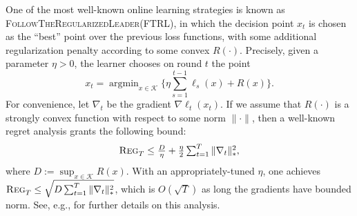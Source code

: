 \documentclass[pmlr]{jmlr} %
\def\K{\mathcal{K}}
\def\argmin{\mathop{\arg\min}}
\def\FTRL{\textsc{FollowTheRegularizedLeader}\xspace}
\newcommand{\uregret}[1]{\textsc{Reg}^{#1}_T}
\begin{document}
One of the most well-known online learning strategies is known as \FTRL (FTRL), in which the decision point $x_{t}$ is chosen as the ``best'' point over the previous loss functions, with some additional regularization penalty according to some convex $R(\cdot)$. Precisely, given a parameter $\eta > 0$, the learner chooses on round $t$ the point
\begin{equation}\label{eq:FTRL}
\textstyle    x_{t} = \argmin_{x \in \K} \{ \eta \textstyle \sum_{s=1}^{t-1} \ell_{s}(x) + R(x) \}.
\end{equation}
For convenience, let $\nabla_{t}$ be the gradient $\nabla \ell_{t}(x_{t})$. If we assume that $R(\cdot)$ is a strongly convex function with respect to some norm $\| \cdot \|$, then a well-known 
regret analysis grants the following bound:
\begin{equation}\label{eq:FTRLbound}
  \textstyle \uregret{} \leq \frac D \eta +  \frac \eta 2 \sum_{t=1}^{T} \| \nabla_{t} \|_{*}^{2},
\end{equation}
where $D := \sup_{x \in \K} R(x)$. With an appropriately-tuned $\eta$, one achieves $\uregret{} \leq \sqrt{D\sum_{t=1}^{T} \| \nabla_{t}\|_{*}^{2}}$, which is $O(\sqrt{T})$ as long the gradients have bounded norm. See, e.g., \cite{shalev2012online,H14,RS16} for further details on this analysis.
\end{document}

